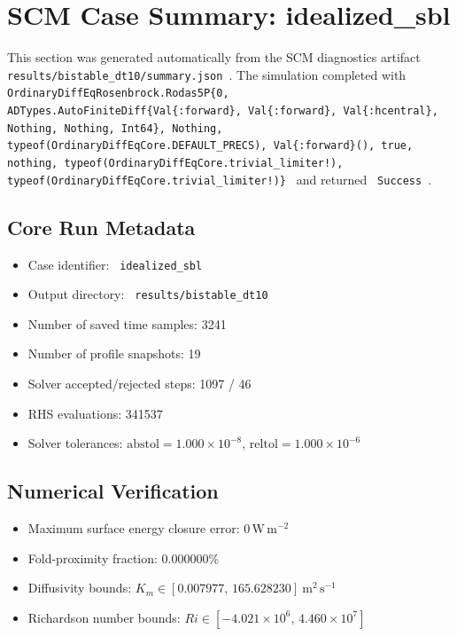 \section{SCM Case Summary: idealized\_sbl}
\label{sec:scm_case_idealized_sbl}

This section was generated automatically from the SCM diagnostics artifact
\texttt{ results/bistable\_dt10/summary.json }. The simulation completed with \texttt{ OrdinaryDiffEqRosenbrock.Rodas5P\{0, ADTypes.AutoFiniteDiff\{Val\{:forward\}, Val\{:forward\}, Val\{:hcentral\}, Nothing, Nothing, Int64\}, Nothing, typeof(OrdinaryDiffEqCore.DEFAULT\_PRECS), Val\{:forward\}(), true, nothing, typeof(OrdinaryDiffEqCore.trivial\_limiter!), typeof(OrdinaryDiffEqCore.trivial\_limiter!)\} }
and returned \texttt{ Success }.

\subsection{Core Run Metadata}
\begin{itemize}
  \item Case identifier: \texttt{ idealized\_sbl }
  \item Output directory: \texttt{ results/bistable\_dt10 }
  \item Number of saved time samples: 3241
  \item Number of profile snapshots: 19
  \item Solver accepted/rejected steps: 1097 / 46
  \item RHS evaluations: 341537
  \item Solver tolerances: $\mathrm{abstol}=1.000 \times 10^{-8}$, $\mathrm{reltol}=1.000 \times 10^{-6}$
\end{itemize}

\subsection{Numerical Verification}
\begin{itemize}
  \item Maximum surface energy closure error:
  $0\,\mathrm{W\,m^{-2}}$
  \item Fold-proximity fraction:
  $0.000000\%$
  \item Diffusivity bounds:
  $K_m \in [0.007977,\,165.628230]~\mathrm{m^2\,s^{-1}}$
  \item Richardson number bounds:
  $Ri \in [-4.021 \times 10^{6},\,4.460 \times 10^{7}]$
\end{itemize}

